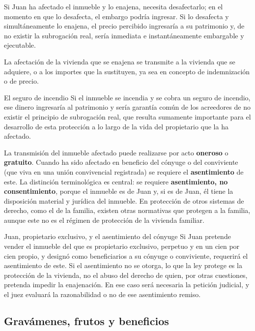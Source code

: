 \documentclass[12pt,oneside]{book}
\begin{document}
Si Juan ha afectado el inmueble y lo enajena, necesita desafectarlo; en el momento en que lo desafecta, el embargo podría ingresar. Si lo desafecta y simultáneamente lo enajena, el precio percibido ingresaría a su patrimonio y, de no existir la subrogación real, sería inmediata e instantáneamente embargable y ejecutable.

\begin{important}
La afectación de la vivienda que se enajena se transmite a la vivienda que se adquiere, o a los importes que la sustituyen, ya sea en concepto de indemnización o de precio.
\end{important}

\begin{example}{El seguro de incendio}
Si el inmueble se incendia y se cobra un seguro de incendio, ese dinero ingresaría al patrimonio y sería garantía común de los acreedores de no existir el principio de subrogación real, que resulta sumamente importante para el desarrollo de esta protección a lo largo de la vida del propietario que la ha afectado.
\end{example}

La transmisión del inmueble afectado puede realizarse por acto \textbf{oneroso} o \textbf{gratuito}. Cuando ha sido afectado en beneficio del cónyuge o del conviviente (que viva en una unión convivencial registrada) se requiere el \textbf{asentimiento} de este. La distinción terminológica es central: se requiere \textbf{asentimiento, no consentimiento}, porque el inmueble es de Juan y, si es de Juan, él tiene la disposición material y jurídica del inmueble. En protección de otros sistemas de derecho, como el de la familia, existen otras normativas que protegen a la familia, aunque este no es el régimen de protección de la vivienda familiar.

\begin{example}{Juan, propietario exclusivo, y el asentimiento del cónyuge}
Si Juan pretende vender el inmueble del que es propietario exclusivo, perpetuo y en un cien por cien propio, y designó como beneficiarios a su cónyuge o conviviente, requerirá el asentimiento de este. Si el asentimiento no se otorga, lo que la ley protege es la protección de la vivienda, no el abuso del derecho de quien, por otras cuestiones, pretenda impedir la enajenación. En ese caso será necesaria la petición judicial, y el juez evaluará la razonabilidad o no de ese asentimiento remiso.
\end{example}

\subsection{Gravámenes, frutos y beneficios}
\end{document}
